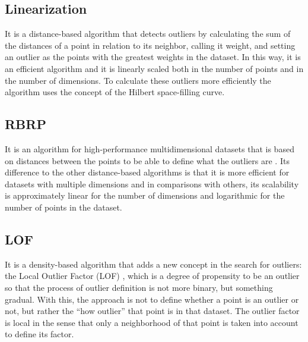 \subsection{Linearization}

It is a distance-based algorithm \cite{10.1007/3-540-45681-3_2} that detects outliers by calculating the sum of the distances
of a point in relation to its neighbor, calling it weight, and setting an outlier as the points
with the greatest weights in the dataset. In this way, it is an efficient algorithm and it is
linearly scaled both in the number of points and in the number of dimensions. To calculate these
outliers more efficiently the algorithm uses the concept of the Hilbert space-filling curve.

\subsection{RBRP}

It is an algorithm for high-performance multidimensional datasets that is based on distances between the points to be able to define what the outliers are \cite{Ghoting2006}. Its difference to the other distance-based algorithms is that it is more efficient for datasets with multiple dimensions and in comparisons with others, its scalability is approximately linear for the number of dimensions and logarithmic for the number of points in the dataset.

\subsection{LOF}

It is a density-based algorithm that adds a new concept in the search for outliers: the
Local Outlier Factor (LOF) \cite{Breunig:2000:LID:335191.335388}, which is a degree of propensity to be an outlier so that the
process of outlier definition is not more binary, but something gradual. With this, the
approach is not to define whether a point is an outlier or not, but rather the ``how outlier''
that point is in that dataset. The outlier factor is local in the sense that only a neighborhood
of that point is taken into account to define its factor.




